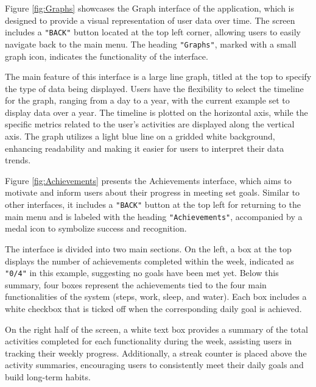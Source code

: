 \documentclass[12pt]{article}
\begin{document}
Figure \ref{fig:Graphs} showcases the Graph interface of the application, which is
designed to provide a visual representation of user data over time. The screen 
includes a \texttt{"BACK"} button located at the top left corner, allowing users to easily
navigate back to the main menu. The heading \texttt{"Graphs"}, marked with a small graph icon,
indicates the functionality of the interface.\par

The main feature of this interface is a large line graph, titled at the top to specify
the type of data being displayed. Users have the flexibility to select the timeline 
for the graph, ranging from a day to a year, with the current example set to display
data over a year. The timeline is plotted on the horizontal axis, while the specific
metrics related to the user’s activities are displayed along the vertical axis. The 
graph utilizes a light blue line on a gridded white background, enhancing readability
and making it easier for users to interpret their data trends.\par

Figure \ref{fig:Achievements} presents the Achievements interface, which aims to motivate
and inform users about their progress in meeting set goals. Similar to other interfaces,
it includes a \texttt{"BACK"} button at the top left for returning to the main menu and is labeled
with the heading \texttt{"Achievements"}, accompanied by a medal icon to symbolize success and recognition.\par

The interface is divided into two main sections. On the left, a box at the top displays
the number of achievements completed within the week, indicated as \texttt{"0/4"} in this example,
suggesting no goals have been met yet. Below this summary, four boxes represent the 
achievements tied to the four main functionalities of the system (steps, work, sleep, and
water). Each box includes a white checkbox that is ticked off when the corresponding daily
goal is achieved.\par

On the right half of the screen, a white text box provides a summary of the total activities
completed for each functionality during the week, assisting users in tracking their weekly
progress. Additionally, a streak counter is placed above the activity summaries, encouraging
users to consistently meet their daily goals and build long-term habits.\par
\end{document}
